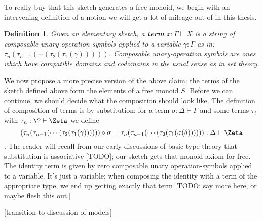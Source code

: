 \documentclass[12pt,twoside]{reedthesis}
\newtheorem{definition}{Definition}
\begin{document}
To really buy that this sketch generates a free monoid, we begin with an
intervening definition of a notion we will get a lot of mileage out of in this
thesis.
\begin{definition}
  Given an elementary sketch, a \textbf{term} $x : \Gamma \vdash X$ is a string of
  composable unary operation-symbols applied to a variable $\gamma : \Gamma$ as in:
  \( \tau_{n} (\tau_{n-1} (\cdots (\tau_{2}(\tau_{1}(\gamma))))) \). Composable unary-operation
  symbols are ones which have compatible domains and codomains in the usual
  sense as in set theory.
\end{definition}
We now propose a more precise version of the above claim: the terms of the
sketch defined above form the elements of a free monoid \( S \). Before we can
continue, we should decide what the composition should look like. The definition
of composition of terms is by substitution: for a term \( \sigma : \Delta \vdash \Gamma\) and some
terms \( \tau_{i}\) with \( \tau_{n} : \? \vdash \Zeta \) we define
\[ (\tau_{n} (\tau_{n-1} (\cdots (\tau_{2}(\tau_{1}(\gamma)))))) \circ \sigma = \tau_{n} (\tau_{n-1} (\cdots (\tau_{2}(\tau_{1}(\sigma(\delta)))))) : \Delta \vdash \Zeta \].
The reader will recall from our early discussions of basic type theory that
substitution is associative [TODO]; our sketch gets that monoid axiom for free. The
identity term is given by zero composable unary operation-symbols applied to a
variable. It's just a variable; when composing the identity with a term of the
appropriate type, we end up getting exactly that term [TODO: say more here, or maybe
flesh this out.]

  [transition to discussion of models]
\end{document}

